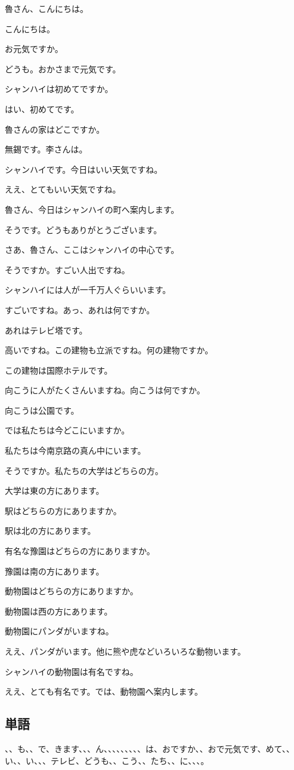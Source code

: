 \documentclass[a5j]{ltjtarticle}
\newcommand*{\RuSpeaks}{\item[魯]}
\newcommand*{\LiSpeaks}{\item[李]}
\begin{document}
\begin{dialogue}[labelwidth=\zw]
  \LiSpeaks 魯さん、こんにちは。
  \RuSpeaks こんにちは。
  \LiSpeaks お元気ですか。
  \RuSpeaks どうも。おかさまで元気です。
  \LiSpeaks シャンハイは初めてですか。
  \RuSpeaks はい、初めてです。
  \LiSpeaks 魯さんの家はどこですか。
  \RuSpeaks 無錫です。李さんは。
  \LiSpeaks シャンハイです。今日はいい天気ですね。
  \RuSpeaks ええ、とてもいい天気ですね。
  \LiSpeaks 魯さん、今日はシャンハイの町へ案内します。
  \RuSpeaks そうです。どうもありがとうございます。
\item[]
  \LiSpeaks さあ、魯さん、ここはシャンハイの中心です。
  \RuSpeaks そうですか。すごい人出ですね。
  \LiSpeaks シャンハイには人が一千万人ぐらいいます。
  \RuSpeaks すごいですね。あっ、あれは何ですか。
  \LiSpeaks あれはテレビ塔です。
  \RuSpeaks 高いですね。この建物も立派ですね。何の建物ですか。
  \LiSpeaks この建物は国際ホテルです。
  \RuSpeaks 向こうに人がたくさんいますね。向こうは何ですか。
  \LiSpeaks 向こうは公園です。
  \RuSpeaks では私たちは今どこにいますか。
  \LiSpeaks 私たちは今南京路の真ん中にいます。
  \RuSpeaks そうですか。私たちの大学はどちらの方。
  \LiSpeaks 大学は東の方にあります。
  \RuSpeaks 駅はどちらの方にありますか。
  \LiSpeaks 駅は北の方にあります。
  \RuSpeaks 有名な豫園はどちらの方にありますか。
  \LiSpeaks 豫園は南の方にあります。
  \RuSpeaks 動物園はどちらの方にありますか。
  \LiSpeaks 動物園は西の方にあります。
  \RuSpeaks 動物園にパンダがいますね。
  \LiSpeaks ええ、パンダがいます。他に熊や虎などいろいろな動物います。
  \RuSpeaks シャンハイの動物園は有名ですね。
  \LiSpeaks ええ、とても有名です。では、動物園へ案内します。
\end{dialogue}

\subsection*{単語}

\begin{onehalfspace}
  、、も、、で、きます、、、ん、、、、、、、、、は、おですか、、おで元気です、めて、、い、、い、、、テレビ、どうも、、こう、、たち、、に、、、。
\end{onehalfspace}
\end{document}
